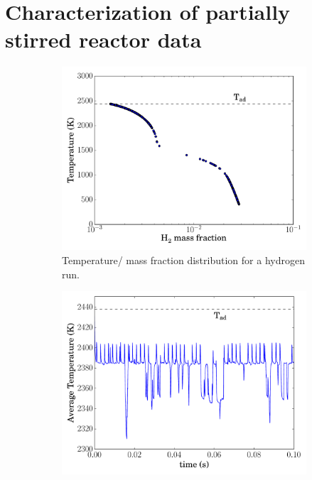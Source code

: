 \documentclass[11pt]{scrartcl}
\begin{document}
\clearpage

\section{Characterization of partially stirred reactor data}
\label{S:pasr_charac}

\begin{figure}[htbp]
  \centering
  \begin{subfigure}{0.48\textwidth}
      \includegraphics[width=\linewidth]{H2_pasr_dist.pdf}
      \caption{Temperature\slash {} mass fraction distribution for a hydrogen run.}
  \end{subfigure}
  \hfill
  \begin{subfigure}{0.48\textwidth}
      \includegraphics[width=\linewidth]{H2_pasr_tbar.pdf}

\end{subfigure}
\end{figure}
\end{document}
